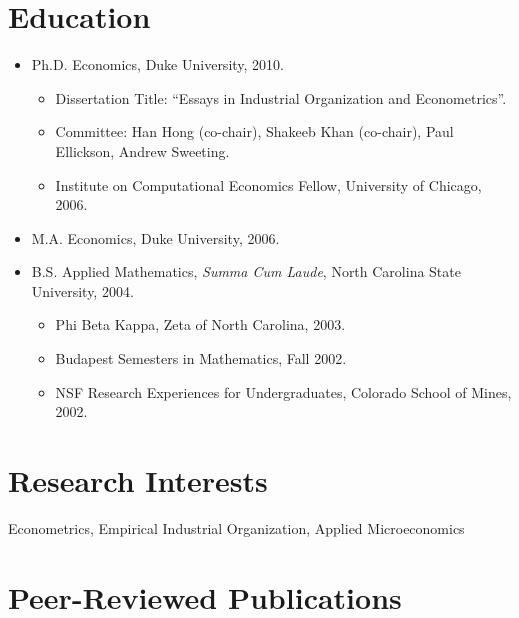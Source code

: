 \documentclass[10pt,letterpaper]{article}
\begin{document}
\section*{Education}

\begin{itemize}
  \item Ph.D. Economics, Duke University, 2010.
    \begin{itemize}
    \item Dissertation Title: ``Essays in Industrial Organization and Econometrics''.
    \item Committee: Han Hong (co-chair), Shakeeb Khan (co-chair), Paul Ellickson, Andrew Sweeting.
    \item Institute on Computational Economics Fellow, University of Chicago, 2006.
    \end{itemize}
  \item M.A. Economics, Duke University, 2006.
  \item B.S. Applied Mathematics, \textit{Summa Cum Laude},
    North Carolina State University, 2004.
    \begin{itemize}
    \item Phi Beta Kappa, Zeta of North Carolina, 2003.
    \item Budapest Semesters in Mathematics, Fall 2002.
    \item NSF Research Experiences for Undergraduates, Colorado School of Mines, 2002.
    \end{itemize}
\end{itemize}

\section*{Research Interests}

Econometrics, Empirical Industrial Organization, Applied Microeconomics

\section*{Peer-Reviewed Publications}
\end{document}

